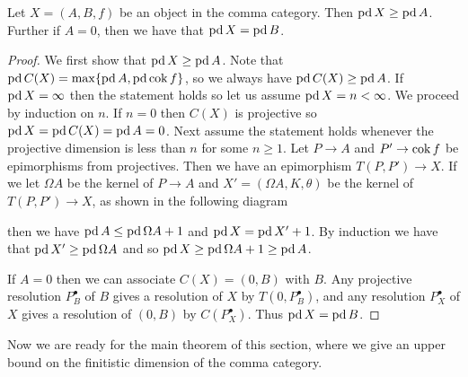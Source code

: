 \begin{prop}\cite[Lemma~4.16]{FGR75}\label{prop:pd_in_commacat}
	Let $X = (A, B, f)$ be an object in the comma category. Then $\operatorname{pd} X \geq \operatorname{pd} A$. Further if $A=0$, then we have that $\operatorname{pd} X = \operatorname{pd} B$.
	\begin{proof}
		We first show that $\operatorname{pd} X \geq \operatorname{pd} A$. Note that $\operatorname{pd} C(X) = \max\{ \operatorname{pd} A, \operatorname{pd} \operatorname{cok} f \}$, so we always have $\operatorname{pd} C(X) \geq \operatorname{pd} A$. If $\operatorname{pd} X = \infty$ then the statement holds so let us assume $\operatorname{pd} X = n < \infty$. We proceed by induction on $n$. If $n=0$ then $C(X)$ is projective so $\operatorname{pd} X = \operatorname{pd} C(X) = \operatorname{pd} A = 0$. Next assume the statement holds whenever the projective dimension is less than $n$ for some $n \geq 1$. Let $P \to A$ and $P' \to \operatorname{cok} f$ be epimorphisms from projectives. Then we have an epimorphism $T(P, P') \to X$. If we let $\Omega A$ be the kernel of $P \to A$ and $X' = (\Omega A, K, \theta)$ be the kernel of $T(P, P') \to X$, as shown in the following diagram
		\begin{center}
		\end{center}
		then we have $\operatorname{pd} A \leq \operatorname{pd} \Omega A + 1$ and $\operatorname{pd} X = \operatorname{pd} X' + 1$. By induction we have that $\operatorname{pd} X' \geq \operatorname{pd} \Omega A$ and so $\operatorname{pd} X \geq \operatorname{pd} \Omega A +1 \geq \operatorname{pd} A$. 
		
		If $A=0$ then we can associate $C(X)=(0, B)$ with $B$. Any projective resolution $P_B^\bullet$ of $B$ gives a resolution of $X$ by $T(0, P_B^\bullet)$, and any resolution $P_X^\bullet$ of $X$ gives a resolution of $(0, B)$ by $C(P_X^\bullet)$. Thus $\operatorname{pd} X = \operatorname{pd} B$.
	\end{proof}
\end{prop}

Now we are ready for the main theorem of this section, where we give an upper bound on the finitistic dimension of the comma category.

